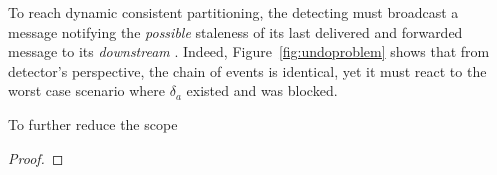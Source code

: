 To reach dynamic consistent partitioning, the detecting \process must
broadcast a message notifying the \emph{possible} staleness of its
last delivered and forwarded message to its \emph{downstream}
\processes. Indeed, Figure~\ref{fig:undoproblem} shows that from
detector's perspective, the chain of events is identical, yet it must
react to the worst case scenario where $\delta_a$ existed and was
blocked.  

\begin{definition}
  To further reduce the scope  
\end{definition}

\begin{theorem}
\end{theorem}

\begin{proof}
\end{proof}



